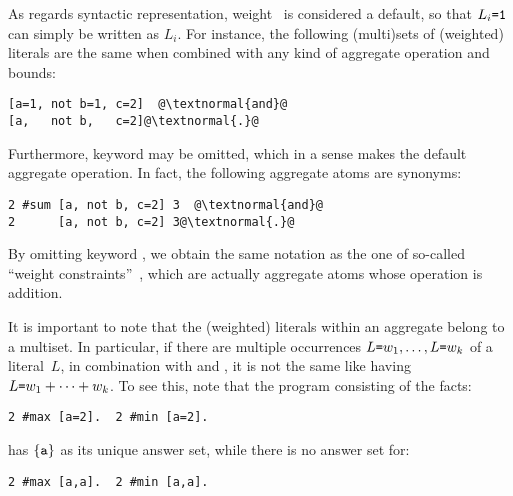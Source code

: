 As regards syntactic representation,
weight~ is considered a default,
so that $L_i\texttt{=}\texttt{1}$ can simply be written as $L_i$.
For instance, the following (multi)sets of (weighted) literals are the same
when combined with any kind of aggregate operation and bounds:
\begin{lstlisting}[numbers=none,escapechar=@]
[a=1, not b=1, c=2]  @\textnormal{and}@
[a,   not b,   c=2]@\textnormal{.}@
\end{lstlisting}
%
Furthermore,
keyword  may be omitted, which in a sense makes  the default
aggregate operation.
In fact, the following aggregate atoms are synonyms:
\begin{lstlisting}[numbers=none,escapechar=@]
2 #sum [a, not b, c=2] 3  @\textnormal{and}@
2      [a, not b, c=2] 3@\textnormal{.}@
\end{lstlisting}
By omitting keyword , we obtain the same notation as the one of 
so-called ``weight constraints''~\cite{siniso02a,lparseManual}, which are actually aggregate atoms
whose operation is addition.

It is important to note that the (weighted) literals within an aggregate
belong to a multiset.
In particular, if there are multiple occurrences
$L\texttt{=}w_1,\dots,L\texttt{=}w_k$
of a literal~$L$, in combination with  and ,
it is not the same like having $L\texttt{=}w_1+\dots+w_k$.
To see this, note that the program consisting of the facts:
\begin{lstlisting}[numbers=none]
2 #max [a=2].  2 #min [a=2].
\end{lstlisting}
has $\{\texttt{a}\}$ as its unique answer set, while there is no answer set for:
\begin{lstlisting}[numbers=none]
2 #max [a,a].  2 #min [a,a].
\end{lstlisting}

